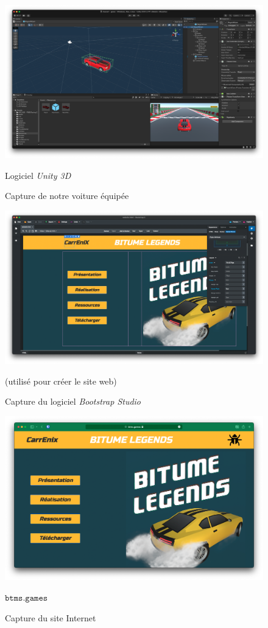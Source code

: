 \documentclass[12pt,a4paper]{article}
\begin{document}
\begin{figure}[t]
    \centering
    \includegraphics[width=12cm]{prefab.png}
    \caption{Capture de notre voiture équipée}
    \label{fig:prefab}
    Logiciel \textsl{Unity 3D}
\end{figure}

\begin{figure}[h]
    \centering
    \includegraphics[width=12cm]{bootstrap.png}
    \caption{Capture du logiciel \textsl{Bootstrap Studio}}
    \label{fig:bootstrap}
    (utilisé pour créer le site web)
\end{figure}

\begin{figure}[h]
    \centering
    \includegraphics[width=15cm]{site.png}
    \caption{Capture du site Internet}
    \label{fig:site}
    \(\mathtt{btms.games}\)
\end{figure}
\end{document}
